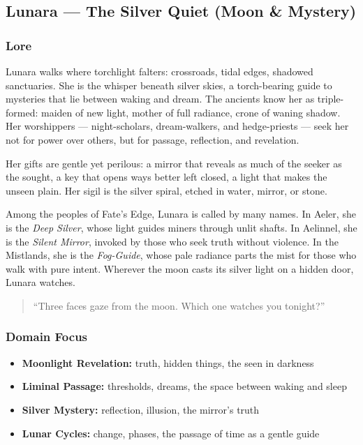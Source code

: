 
\subsection{Lunara --- The Silver Quiet (Moon \& Mystery)}

\subsubsection*{Lore}
Lunara walks where torchlight falters: crossroads, tidal edges, shadowed sanctuaries. She is the whisper beneath silver skies, a torch-bearing guide to mysteries that lie between waking and dream. The ancients know her as triple-formed: maiden of new light, mother of full radiance, crone of waning shadow. Her worshippers --- night-scholars, dream-walkers, and hedge-priests --- seek her not for power over others, but for passage, reflection, and revelation.

Her gifts are gentle yet perilous: a mirror that reveals as much of the seeker as the sought, a key that opens ways better left closed, a light that makes the unseen plain. Her sigil is the silver spiral, etched in water, mirror, or stone.

Among the peoples of Fate's Edge, Lunara is called by many names. In Aeler, she is the \textit{Deep Silver}, whose light guides miners through unlit shafts. In Aelinnel, she is the \textit{Silent Mirror}, invoked by those who seek truth without violence. In the Mistlands, she is the \textit{Fog-Guide}, whose pale radiance parts the mist for those who walk with pure intent. Wherever the moon casts its silver light on a hidden door, Lunara watches.

\begin{quote}
``Three faces gaze from the moon. Which one watches you tonight?''
\end{quote}

\subsubsection*{Domain Focus}
\begin{itemize}
  \item \textbf{Moonlight Revelation:} truth, hidden things, the seen in darkness
  \item \textbf{Liminal Passage:} thresholds, dreams, the space between waking and sleep
  \item \textbf{Silver Mystery:} reflection, illusion, the mirror's truth
  \item \textbf{Lunar Cycles:} change, phases, the passage of time as a gentle guide
\end{itemize}


